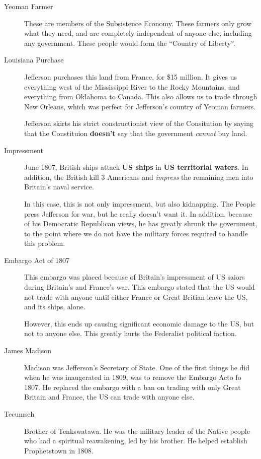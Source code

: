 \begin{description}
\item[Yeoman Farmer] These are members of the Subsistence Economy.
  These farmers only grow what they need, and are completely independent of anyone else, including any government.
  These people would form the ``Country of Liberty''.

\item[Louisiana Purchase] Jefferson purchases this land from France, for \$15 million.
  It gives us everything west of the Mississippi River to the Rocky Mountains, and everything from Oklahoma to Canada.
  This also allows us to trade through New Orleans, which was perfect for Jefferson's country of Yeoman farmers.

  Jefferson skirts his strict constructionist view of the Consitution by saying that the Constituion \textbf{doesn't} say that the government \textit{cannot} buy land.

\item[Impressment] June 1807, British ships attack \textbf{US ships} in \textbf{US territorial waters}.
  In addition, the British kill 3 Americans and \emph{impress} the remaining men into Britain's naval service.

  In this case, this is not only impressment, but also kidnapping.
  The People press Jefferson for war, but he really doesn't want it.
  In addition, because of his Democratic Republican views, he has greatly shrunk the government, to the point where we do not have the military forces required to handle this problem.

\item[Embargo Act of 1807] This embargo was placed because of Britain's impressment of US saiors during Britain's and France's war.
  This embargo stated that the US would not trade with anyone until either France or Great Britian leave the US, and its ships, alone.

  However, this ends up causing significant economic damage to the US, but not to anyone else.
  This greatly hurts the Federalist political faction.

\item[James Madison] Madison was Jefferson's Secretary of State.
  One of the first things he did when he was inaugerated in 1809, was to remove the Embargo Acto fo 1807.
  He replaced the embargo with a ban on trading with only Great Britain and France, the US can trade with anyone else.

\item[Tecumseh] Brother of Tenkswatawa.
  He was the military leader of the Native people who had a spiritual reawakening, led by his brother.
  He helped establish Prophetstown in 1808.


\end{description}
